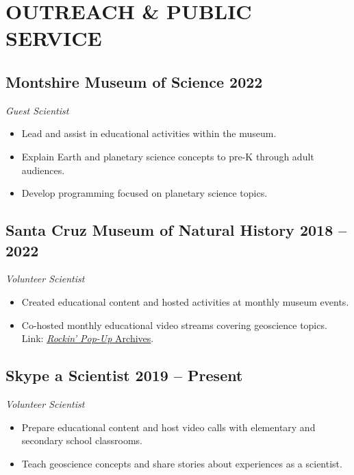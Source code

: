 \documentclass[10pt]{article}
\begin{document}

\section*{OUTREACH \& PUBLIC SERVICE}

\subsection*{\textbf{Montshire Museum of Science} \hfill 2022}
\textit{Guest Scientist}
\begin{itemize}
\item Lead and assist in educational activities within the museum.
\item Explain Earth and planetary science concepts to pre-K through adult audiences.
\item Develop programming focused on planetary science topics.
\end{itemize}

\subsection*{\textbf{Santa Cruz Museum of Natural History} \hfill 2018 – 2022}
\textit{Volunteer Scientist}
\begin{itemize}
	\item Created educational content and hosted activities at monthly museum events.
	\item Co-hosted monthly educational video streams covering geoscience topics. \\
	Link: \href{https://www.santacruzmuseum.org/category/rockin-pop-up/}{\emph{Rockin' Pop-Up} Archives}.
\end{itemize}

\subsection*{\textbf{Skype a Scientist} \hfill 2019 – Present}
\textit{Volunteer Scientist}
\begin{itemize}
	\item Prepare educational content and host video calls with elementary and secondary school classrooms.
	\item Teach geoscience concepts and share stories about experiences as a scientist.
\end{itemize}
\end{document}
